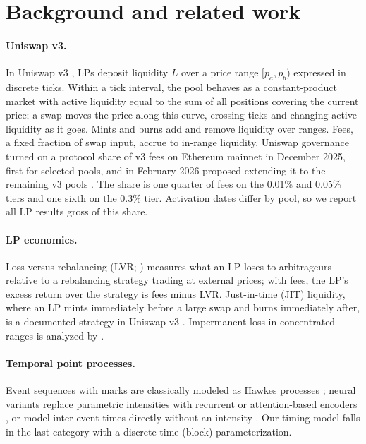 \documentclass[11pt]{article}
\begin{document}
\section{Background and related work}

\paragraph{Uniswap v3.} In Uniswap v3 \citep{adams2021uniswap}, LPs deposit liquidity $L$ over a price range $[p_a, p_b)$ expressed in discrete ticks. Within a tick interval, the pool behaves as a constant-product market with active liquidity equal to the sum of all positions covering the current price; a swap moves the price along this curve, crossing ticks and changing active liquidity as it goes. Mints and burns add and remove liquidity over ranges. Fees, a fixed fraction of swap input, accrue to in-range liquidity. Uniswap governance turned on a protocol share of v3 fees on Ethereum mainnet in December 2025, first for selected pools, and in February 2026 proposed extending it to the remaining v3 pools \citep{uniswapgov2025,uniswapgov2026}. The share is one quarter of fees on the 0.01\% and 0.05\% tiers and one sixth on the 0.3\% tier. Activation dates differ by pool, so we report all LP results gross of this share.

\paragraph{LP economics.} Loss-versus-rebalancing (LVR; \citealp{milionis2022lvr}) measures what an LP loses to arbitrageurs relative to a rebalancing strategy trading at external prices; with fees, the LP's excess return over the strategy is fees minus LVR. Just-in-time (JIT) liquidity, where an LP mints immediately before a large swap and burns immediately after, is a documented strategy in Uniswap v3 \citep{wan2022jit}. Impermanent loss in concentrated ranges is analyzed by \citet{loesch2021impermanent}.

\paragraph{Temporal point processes.} Event sequences with marks are classically modeled as Hawkes processes \citep{hawkes1971}; neural variants replace parametric intensities with recurrent or attention-based encoders \citep{mei2017neuralhawkes,zuo2020transformerhawkes}, or model inter-event times directly without an intensity \citep{shchur2020intensityfree}. Our timing model falls in the last category with a discrete-time (block) parameterization.
\end{document}
